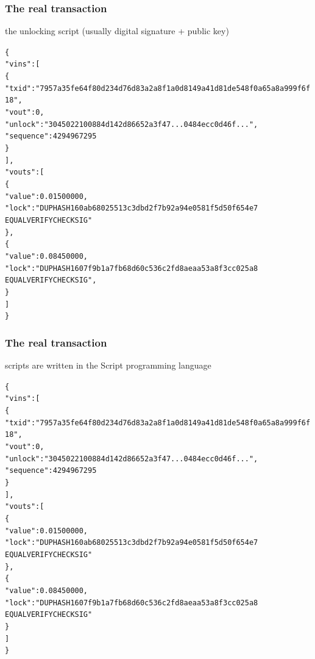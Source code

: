 \documentclass[11pt]{beamer}  %
\begin{document}
\begin{frame}[fragile]\frametitle{The real transaction}

  \begin{center}
    the unlocking script (usually digital signature + public key)
  \end{center}

  {\scriptsize\begin{alltt}
\{
  "vins": [
    \{
      "txid": "7957a35fe64f80d234d76d83a2a8f1a0d8149a41d81de548f0a65a8a999f6f18",
      "vout": 0,
      \alert{"unlock": "3045022100884d142d86652a3f47... 0484ecc0d46f..."},
      "sequence": 4294967295
    \}
  ],
  "vouts": [
    \{
      "value": 0.01500000,
      "lock": "DUP HASH160 ab68025513c3dbd2f7b92a94e0581f5d50f654e7
               EQUALVERIFY CHECKSIG"
    \},
    \{
      "value": 0.08450000,
      "lock": "DUP HASH160 7f9b1a7fb68d60c536c2fd8aeaa53a8f3cc025a8
               EQUALVERIFY CHECKSIG",
    \}
  ]
\}
\end{alltt}}

\end{frame}

\begin{frame}[fragile]\frametitle{The real transaction}

  \begin{center}
    scripts are written in the Script programming language
  \end{center}

  {\scriptsize\begin{alltt}
\{
  "vins": [
    \{
      "txid": "7957a35fe64f80d234d76d83a2a8f1a0d8149a41d81de548f0a65a8a999f6f18",
      "vout": 0,
      "unlock": \alert{"3045022100884d142d86652a3f47... 0484ecc0d46f..."},
      "sequence": 4294967295
    \}
  ],
  "vouts": [
    \{
      "value": 0.01500000,
      "lock": \alert{"DUP HASH160 ab68025513c3dbd2f7b92a94e0581f5d50f654e7
               EQUALVERIFY CHECKSIG"}
    \},
    \{
      "value": 0.08450000,
      "lock": \alert{"DUP HASH160 7f9b1a7fb68d60c536c2fd8aeaa53a8f3cc025a8
               EQUALVERIFY CHECKSIG"}
    \}
  ]
\}
\end{alltt}}

\end{frame}
\end{document}
